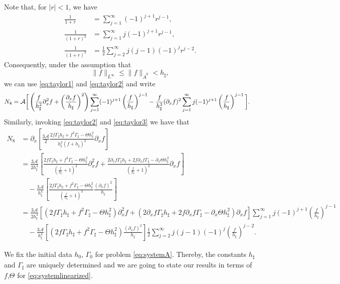 \documentclass[reqno,11pt]{amsart}
\newcommand{\pax}{\partial_x}
\newcommand{\bh}{h_\sharp}
\newcommand{\bG}{\Gamma_\sharp}
\begin{document}
Note that, for $|r|<1$, we have
\begin{align}
\frac{1}{1+r}&=\sum_{j=1}^\infty (-1)^{j+1}r^{j-1},\label{eq:taylor1} \\
\frac{1}{\left(1+r\right)^2}&=\sum_{j=1}^\infty j(-1)^{j+1}r^{j-1},\label{eq:taylor2}\\
\frac{1}{\left(1+r\right)^3}&=\frac{1}{2}\sum_{j=2}^\infty j(j-1)(-1)^{j}r^{j-2}.\label{eq:taylor3}
\end{align}
Consequently, under the assumption that
\begin{equation}\label{restriction1}
\|f\|_{L^\infty}\leq \|f\|_{\dot A^0}< \bh,
\end{equation}
 we can use \eqref{eq:taylor1} and \eqref{eq:taylor2} and write
\begin{align}
N_4&=\mathcal{A} \bigg{[}\left(\frac{f}{\bh^2}\partial_x^2 f +\left(\frac{\partial_x f}{\bh}\right)^2\right)\sum_{j=1}^\infty (-1)^{j+1}\left(\frac{f}{\bh}\right)^{j-1}-\frac{f}{\bh^3}(\partial_x f)^2\sum_{j=1}^\infty j(-1)^{j+1}\left(\frac{f}{\bh}\right)^{j-1} \bigg{]}.\label{NL4}
\end{align}
Similarly, invoking  \eqref{eq:taylor2} and \eqref{eq:taylor3} we have that
\begin{align}
N_8&=\partial_x \left[ \frac{3\mathcal{A}}{2}\frac{2f\bG\bh+f^2\bG-\Theta \bh^2}{\bh^2(f+\bh)^2}\partial_x f\right]\nonumber\\
&= \frac{3\mathcal{A}}{2\bh^4}\left[\frac{2f\bG\bh+f^2\bG-\Theta \bh^2}{\left(\frac{f}{\bh}+1\right)^2}\partial_x^2 f+\frac{2\pax f\bG\bh+2f\pax f\bG-\pax \Theta \bh^2}{\left(\frac{f}{\bh}+1\right)^2}\partial_x f\right]\nonumber\\
&\quad- \frac{3\mathcal{A}}{\bh^4}\left[\frac{2f\bG\bh+f^2\bG-\Theta \bh^2}{\left(\frac{f}{\bh}+1\right)^3}\frac{(\partial_x f)^2}{\bh}\right]\nonumber\\
&=\frac{3\mathcal{A}}{2\bh^4}\left[\left(2f\bG\bh+f^2\bG-\Theta \bh^2\right)\partial_x^2 f+\left(2\pax f\bG\bh+2f\pax f\bG-\pax \Theta \bh^2\right)\partial_x f\right]\sum_{j=1}^\infty j(-1)^{j+1}\left(\frac{f}{\bh}\right)^{j-1}\nonumber\\
&\quad- \frac{3\mathcal{A}}{\bh^4}\left[\left(2f\bG\bh+f^2\bG-\Theta \bh^2\right)\frac{(\partial_x f)^2}{\bh}\right]\frac{1}{2}\sum_{j=2}^\infty j(j-1)(-1)^{j}\left(\frac{f}{\bh}\right)^{j-2}.\label{NL8}
\end{align}



\medskip
We fix the initial data $h_0$, $\Gamma_0$ for problem \eqref{eq:systemA}. Thereby, the constants $\bh$ and $\bG$ are uniquely determined and we are going to state our results in terms of  $f$,$\Theta$ for \eqref{eq:systemlinearized}. 
\end{document}

